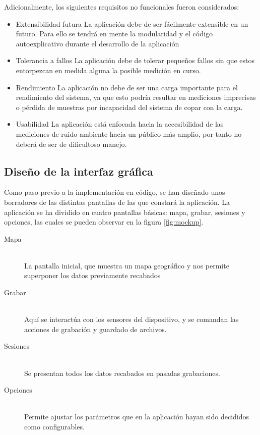 Adicionalmente, los siguientes requisitos no funcionales fueron considerados:

\begin{itemize}
\item Extensibilidad futura
La aplicación debe de ser fácilmente extensible en un futuro. Para ello se tendrá en mente la modularidad y el código autoexplicativo durante el desarrollo de la aplicación 

\item Tolerancia a fallos
La aplicación debe de tolerar pequeños fallos sin que estos entorpezcan en medida alguna la posible medición en curso.

\item Rendimiento
La aplicación no debe de ser una carga importante para el rendimiento del sistema, ya que esto podría resultar en mediciones imprecisas o pérdida de muestras por incapacidad del sistema de copar con la carga.

\item Usabilidad
La aplicación está enfocada hacia la accesibilidad de las mediciones de ruido ambiente hacia un público más amplio, por tanto no deberá de ser de dificultoso manejo.

\end{itemize}
\subsection{Diseño de la interfaz gráfica}

Como paso previo a la implementación en código, se han diseñado unos borradores de las distintas pantallas de las que constará la aplicación. La aplicación se ha dividido en cuatro pantallas básicas: mapa, grabar, sesiones y opciones, las cuales se pueden observar en la figura \ref{fig:mockup}.

\begin{description}
\item[Mapa]\hfill \\
    La pantalla inicial, que muestra un mapa geográfico y nos permite superponer los datos previamente recabados
\item[Grabar]\hfill \\
 Aquí se interactúa con los sensores del dispositivo, y se comandan las acciones de grabación y guardado de archivos.
\item[Sesiones]\hfill \\
 Se presentan todos los datos recabados en pasadas grabaciones.
\item[Opciones]\hfill \\
 Permite ajustar los parámetros que en la aplicación hayan sido decididos como configurables.
\end{description} 

